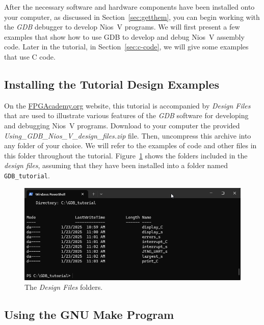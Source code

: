 \documentclass[11pt, twoside, pdftex]{article}
\begin{document}
After the necessary software and hardware components have been installed onto your computer, 
as discussed in Section~\ref{sec:getthem}, you can begin working with the {\it GDB}
debugger to develop Nios~V programs. We will first present a few examples that show how to 
use GDB to develop and debug Nios~V assembly code. Later in the tutorial, in 
Section~\ref{sec:c-code}, we will give some examples that use C code.

\subsection{Installing the Tutorial Design Examples}
\label{sec:egs}

On the {\href{https://www.fpgacademy.org/courses.html} {FPGAcademy.org}} website, this
tutorial is accompanied by {\it Design Files} that are used to illustrate various features
of the {\it GDB} software for developing and debugging Nios~V programs. Download to your 
computer the provided {\it Using\_GDB\_Nios\_V\_design\_files.zip} file. Then, uncompress 
this archive into any 
folder of your choice. We will refer to the examples of code and other files in this folder 
throughout the tutorial. Figure~\ref{fig:designfiles} shows the folders included in the
{\it design files}, assuming that they have been installed into a folder named
\texttt{GDB\_tutorial}.

\begin{figure}[h]
    \begin{center}
        \includegraphics[width=.9\linewidth]{figures/designfiles_new.png}
        \caption{The {\it Design Files} folders.}
        \label{fig:designfiles}
    \end{center}
\end{figure}

\subsection{Using the GNU Make Program}
\end{document}
